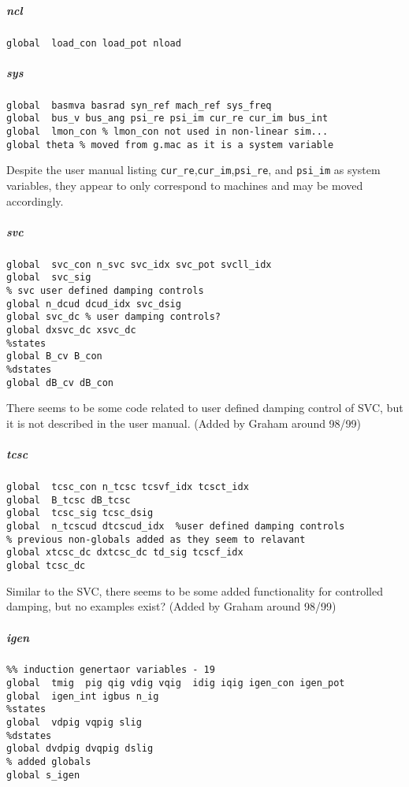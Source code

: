 \documentclass[12pt]{article}
\begin{document}
\subparagraph{ncl}
\begin{verbatim}
global  load_con load_pot nload
\end{verbatim}
\subparagraph{sys}
\begin{verbatim}
global  basmva basrad syn_ref mach_ref sys_freq
global  bus_v bus_ang psi_re psi_im cur_re cur_im bus_int
global  lmon_con % lmon_con not used in non-linear sim...
global theta % moved from g.mac as it is a system variable
\end{verbatim}
Despite the user manual listing \verb|cur_re|,\verb|cur_im|,\verb|psi_re|, and \verb|psi_im| as system variables, they appear to only correspond to machines and may be moved accordingly.
\subparagraph{svc}
\begin{verbatim}
global  svc_con n_svc svc_idx svc_pot svcll_idx
global  svc_sig
% svc user defined damping controls
global n_dcud dcud_idx svc_dsig
global svc_dc % user damping controls?
global dxsvc_dc xsvc_dc
%states
global B_cv B_con
%dstates
global dB_cv dB_con
\end{verbatim}
There seems to be some code related to user defined damping control of SVC, but it is not described in the user manual. 
(Added by Graham around 98/99)


\subparagraph{tcsc}
\begin{verbatim}
global  tcsc_con n_tcsc tcsvf_idx tcsct_idx
global  B_tcsc dB_tcsc
global  tcsc_sig tcsc_dsig
global  n_tcscud dtcscud_idx  %user defined damping controls
% previous non-globals added as they seem to relavant
global xtcsc_dc dxtcsc_dc td_sig tcscf_idx 
global tcsc_dc
\end{verbatim}
Similar to the SVC, there seems to be some added functionality for controlled damping, but no examples exist? (Added by Graham around 98/99)

\subparagraph{igen}
\begin{verbatim}
%% induction genertaor variables - 19
global  tmig  pig qig vdig vqig  idig iqig igen_con igen_pot
global  igen_int igbus n_ig
%states
global  vdpig vqpig slig
%dstates
global dvdpig dvqpig dslig
% added globals
global s_igen
\end{verbatim}
\end{document}

